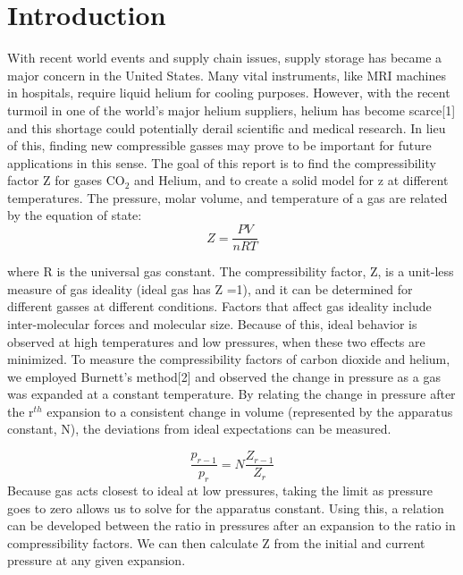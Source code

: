 \documentclass{article}
\begin{document}
\section*{Introduction} 
With recent world events and supply chain issues, supply storage has became a major concern in the United States. Many vital instruments, like MRI machines in hospitals, require liquid helium for cooling purposes. However, with the recent turmoil in one of the world's major helium suppliers, helium has become scarce[1] and this shortage could potentially derail scientific and medical research. In lieu of this, finding new compressible gasses may prove to be important for future applications in this sense.
\noindent The goal of this report is to find the compressibility factor Z for gases CO$_2$ and Helium, and to create a solid model for z at different temperatures.
 The pressure, molar volume, and temperature of a gas are related by the equation of state:
\begin{equation} \label{eq:1} Z=\frac{PV}{nRT} \end{equation}

 \noindent where R is the universal gas constant. The compressibility factor, Z, is a unit-less measure of gas ideality (ideal gas has Z =1), and it can be determined for different gasses at different conditions.
 Factors that affect gas ideality include inter-molecular forces and molecular size. Because of this, ideal behavior is observed at high temperatures and low pressures, when these two effects are minimized.
 \linebreak To measure the compressibility factors of carbon dioxide and helium, we employed Burnett’s method[2] and observed the change in pressure as a gas was expanded at a constant temperature. 
 By relating the change in pressure after the r$^{th}$ expansion to a consistent change in volume (represented by the apparatus constant, N), the deviations from ideal expectations can be measured.
 
\begin{equation} \label{eq:1} \frac{p_{r-1}}{p_{r}} = N\frac{Z_{r-1}}{Z_{r}} \end{equation}
Because gas acts closest to ideal at low pressures, taking the limit as pressure goes to zero allows us to solve for the apparatus constant. Using this, a relation can be developed between the ratio in pressures after an expansion to the ratio in compressibility factors. We can then calculate Z from the initial and current pressure at any given expansion.
\end{document}
